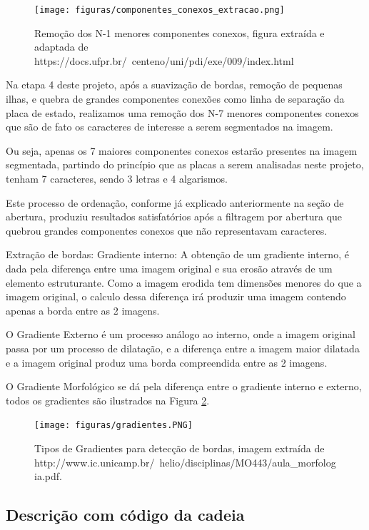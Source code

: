 \documentclass[
	12pt,				%
    oneside,			%
	a4paper,			%
	english,			%
	french,				%
	spanish,			%
	brazil,				%
	]{abntex2}
\begin{document}
\begin{figure}[!ht]
    \centering
    \texttt{[image: figuras/componentes\_conexos\_extracao.png]}
    \caption{Remoção dos N-1 menores componentes conexos, figura extraída e adaptada de https://docs.ufpr.br/~centeno/uni/pdi/exe/009/index.html}
    \label{fig:remocao_componentes_conexos}
\end{figure}

Na etapa 4 deste projeto, após a suavização de bordas, remoção de pequenas ilhas, e quebra de grandes componentes conexões como linha de separação da placa de estado, realizamos uma remoção dos N-7 menores componentes conexos que são de fato os caracteres de interesse a serem segmentados na imagem.

Ou seja, apenas os 7 maiores componentes conexos estarão presentes na imagem segmentada, partindo do princípio que as placas a serem analisadas neste projeto, tenham 7 caracteres, sendo 3 letras e 4 algarismos.

Este processo de ordenação, conforme já explicado anteriormente na seção de abertura, produziu resultados satisfatórios após a filtragem por abertura que quebrou grandes componentes conexos que não representavam caracteres.

Extração de bordas:
Gradiente interno:
A obtenção de um gradiente interno, é dada pela diferença entre uma imagem original e sua erosão através de um elemento estruturante. Como a imagem erodida tem dimensões menores do que a imagem original, o calculo dessa diferença irá produzir uma imagem contendo apenas a borda entre as 2 imagens.

O Gradiente Externo é um processo análogo ao interno, onde a imagem original passa por um processo de dilatação, e a diferença entre a imagem maior dilatada e a imagem original produz uma borda compreendida entre as 2 imagens.

O Gradiente Morfológico se dá pela diferença entre o gradiente interno e externo, todos os gradientes são ilustrados na Figura \ref{fig:tipos_gradientes}.

\begin{figure}[!ht]
    \centering
    \texttt{[image: figuras/gradientes.PNG]}
    \caption{Tipos de Gradientes para detecção de bordas, imagem extraída de http://www.ic.unicamp.br/~helio/disciplinas/MO443/aula\_morfologia.pdf.}
    \label{fig:tipos_gradientes}
\end{figure}

\subsection{Descrição com código da cadeia}
\end{document}
